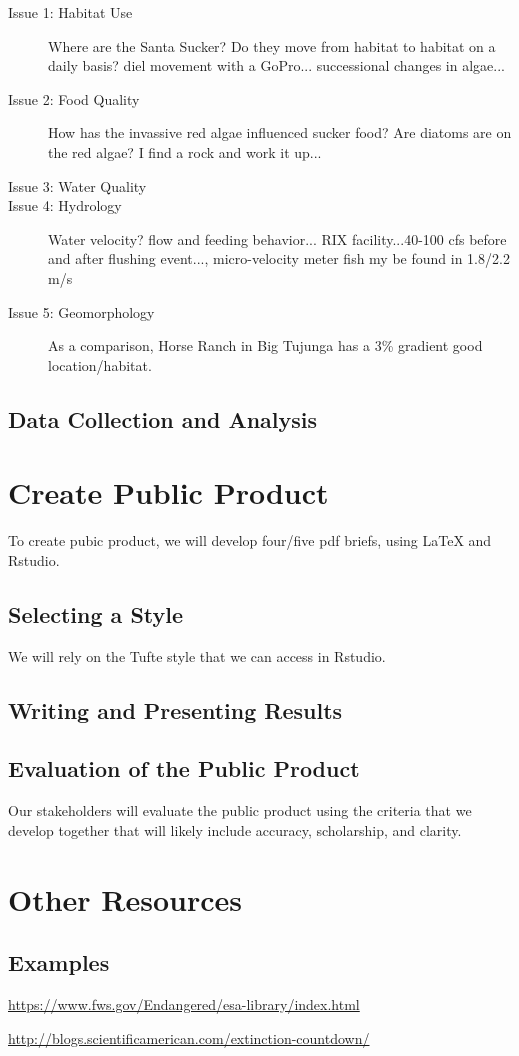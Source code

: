 \documentclass{article}\usepackage[]{graphicx}\usepackage[]{color}
\begin{document}
\begin{description}
  \item[Issue 1: Habitat Use] Where are the Santa Sucker?  Do they move from habitat to habitat on a daily basis?
  diel movement with a GoPro... successional changes in algae...
  
  \item[Issue 2: Food Quality] How has the invassive red algae influenced sucker food? Are diatoms are on the red algae? I
  find a rock and work it up...
  \item[Issue 3: Water Quality] 
  \item[Issue 4: Hydrology]Water velocity? flow and feeding behavior... RIX facility...40-100 cfs before and after flushing event..., micro-velocity meter fish my be found in 1.8/2.2 m/s
  \item[Issue 5: Geomorphology] As a comparison, Horse Ranch in Big Tujunga has a 3\% gradient good location/habitat.
\end{description}



\subsection{Data Collection and Analysis}

\section{Create Public Product}

To create pubic product, we will develop four/five pdf briefs, using LaTeX and Rstudio. 

\subsection{Selecting a Style}

We will rely on the Tufte style that we can access in Rstudio. 

\subsection{Writing and Presenting Results}

\subsection{Evaluation of the Public Product}

Our stakeholders will evaluate the public product using the criteria that we develop together that will likely include accuracy, scholarship, and clarity. 

\section{Other Resources}

\subsection{Examples}

\href{https://www.fws.gov/Endangered/esa-library/index.html}{https://www.fws.gov/Endangered/esa-library/index.html}

\href{http://blogs.scientificamerican.com/extinction-countdown/}{http://blogs.scientificamerican.com/extinction-countdown/}
\end{document}
